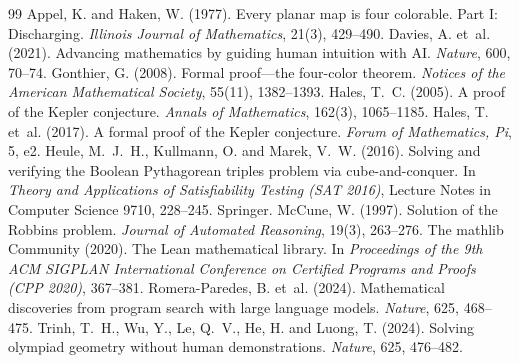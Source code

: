 \documentclass{situationist-preprint}
\begin{document}
\begin{thebibliography}{99}\small
{} Appel, K. and Haken, W. (1977). Every planar map is four colorable. Part I: Discharging. \emph{Illinois Journal of Mathematics}, 21(3), 429--490.
 Davies, A. et~al. (2021). Advancing mathematics by guiding human intuition with AI. \emph{Nature}, 600, 70--74.
 Gonthier, G. (2008). Formal proof---the four-color theorem. \emph{Notices of the American Mathematical Society}, 55(11), 1382--1393.
 Hales, T.~C. (2005). A proof of the Kepler conjecture. \emph{Annals of Mathematics}, 162(3), 1065--1185.
 Hales, T. et~al. (2017). A formal proof of the Kepler conjecture. \emph{Forum of Mathematics, Pi}, 5, e2.
 Heule, M.~J.~H., Kullmann, O. and Marek, V.~W. (2016). Solving and verifying the Boolean Pythagorean triples problem via cube-and-conquer. In \emph{Theory and Applications of Satisfiability Testing (SAT 2016)}, Lecture Notes in Computer Science 9710, 228--245. Springer.
 McCune, W. (1997). Solution of the Robbins problem. \emph{Journal of Automated Reasoning}, 19(3), 263--276.
 The mathlib Community (2020). The Lean mathematical library. In \emph{Proceedings of the 9th ACM SIGPLAN International Conference on Certified Programs and Proofs (CPP 2020)}, 367--381.
 Romera-Paredes, B. et~al. (2024). Mathematical discoveries from program search with large language models. \emph{Nature}, 625, 468--475.
 Trinh, T.~H., Wu, Y., Le, Q.~V., He, H. and Luong, T. (2024). Solving olympiad geometry without human demonstrations. \emph{Nature}, 625, 476--482.
\end{thebibliography}
\end{document}
